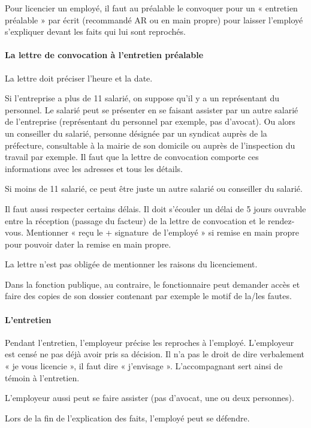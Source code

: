 Pour licencier un employé, il faut au préalable le convoquer pour un « entretien préalable » par écrit (recommandé AR ou en main propre) pour laisser l’employé s’expliquer devant les faits qui lui sont reprochés.

\paragraph{La lettre de convocation à l'entretien préalable}

La lettre doit préciser l’heure et la date.

Si l’entreprise a plus de 11 salarié, on suppose qu’il y a un représentant du personnel.
Le salarié peut se présenter en se faisant assister par un autre salarié de l’entreprise (représentant du personnel par exemple, pas d’avocat).
Ou alors un conseiller du salarié, personne désignée par un syndicat auprès de la préfecture, consultable à la mairie de son domicile ou auprès de l’inspection du travail par exemple.
Il faut que la lettre de convocation comporte ces informations avec les adresses et tous les détails.

Si moins de 11 salarié, ce peut être juste un autre salarié ou conseiller du salarié.

Il faut aussi respecter certains délais.
Il doit s’écouler un délai de 5 jours ouvrable entre la réception (passage du facteur) de la lettre de convocation et le rendez-vous.
Mentionner « reçu le + signature de l’employé » si remise en main propre pour pouvoir dater la remise en main propre.

La lettre n’est pas obligée de mentionner les raisons du licenciement.

Dans la fonction publique, au contraire, le fonctionnaire peut demander accès et faire des copies de son dossier contenant par exemple le motif de la/les fautes.


\paragraph{L'entretien}

Pendant l’entretien, l’employeur précise les reproches à l’employé.
L’employeur est censé ne pas déjà avoir pris sa décision.
Il n’a pas le droit de dire verbalement « je vous licencie », il faut dire « j’envisage ».
L’accompagnant sert ainsi de témoin à l’entretien.

L’employeur aussi peut se faire assister (pas d’avocat, une ou deux personnes).

Lors de la fin de l’explication des faits, l’employé peut se défendre.

